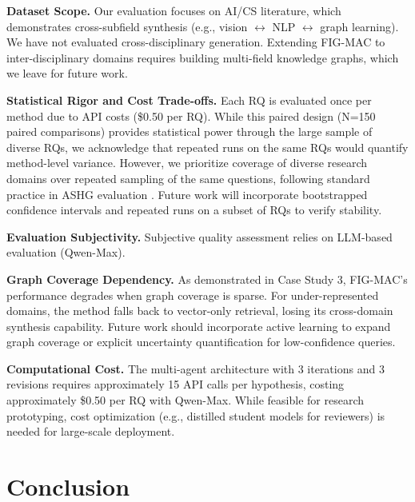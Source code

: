 \documentclass[runningheads]{llncs}
\begin{document}
\textbf{Dataset Scope.} Our evaluation focuses on AI/CS literature, which demonstrates cross-subfield synthesis (e.g., vision $\leftrightarrow$ NLP $\leftrightarrow$ graph learning). We have not evaluated cross-disciplinary generation. Extending FIG-MAC to inter-disciplinary domains requires building multi-field knowledge graphs, which we leave for future work.

\textbf{Statistical Rigor and Cost Trade-offs.} Each RQ is evaluated once per method due to API costs (\$0.50 per RQ). While this paired design (N=150 paired comparisons) provides statistical power through the large sample of diverse RQs, we acknowledge that repeated runs on the same RQs would quantify method-level variance. However, we prioritize coverage of diverse research domains over repeated sampling of the same questions, following standard practice in ASHG evaluation
\cite{DBLP:journals/corr/abs-2408-06292,li2024chain}. Future work will incorporate bootstrapped confidence intervals and repeated runs on a subset of RQs to verify stability.

\textbf{Evaluation Subjectivity.} Subjective quality assessment relies on LLM-based evaluation (Qwen-Max). 

\textbf{Graph Coverage Dependency.} As demonstrated in Case Study 3, FIG-MAC's performance degrades when graph coverage is sparse. For under-represented domains, the method falls back to vector-only retrieval, losing its cross-domain synthesis capability. Future work should incorporate active learning to expand graph coverage or explicit uncertainty quantification for low-confidence queries.

\textbf{Computational Cost.} The multi-agent architecture with 3 iterations and 3 revisions requires approximately 15 API calls per hypothesis, costing approximately \$0.50 per RQ with Qwen-Max. While feasible for research prototyping, cost optimization (e.g., distilled student models for reviewers) is needed for large-scale deployment.


\section{Conclusion}
\label{sec:conclusion}
\end{document}
